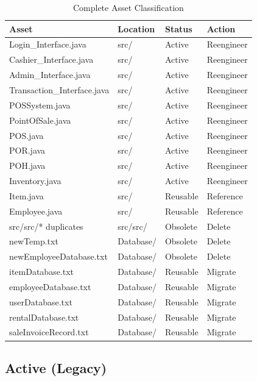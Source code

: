 \begin{table}[h]
  \centering
  \caption{Complete Asset Classification}
  \label{tab:asset-classification}
  \begin{tabular}{p{4cm} p{4.5cm} p{2cm} p{2.5cm}}
    \toprule
    \textbf{Asset} & \textbf{Location} & \textbf{Status} & \textbf{Action} \\
    \midrule
    Login\_Interface.java & src/ & Active & Reengineer \\
    Cashier\_Interface.java & src/ & Active & Reengineer \\
    Admin\_Interface.java & src/ & Active & Reengineer \\
    Transaction\_Interface.java & src/ & Active & Reengineer \\
    POSSystem.java & src/ & Active & Reengineer \\
    PointOfSale.java & src/ & Active & Reengineer \\
    POS.java & src/ & Active & Reengineer \\
    POR.java & src/ & Active & Reengineer \\
    POH.java & src/ & Active & Reengineer \\
    Inventory.java & src/ & Active & Reengineer \\
    Item.java & src/ & Reusable & Reference \\
    Employee.java & src/ & Reusable & Reference \\
    \midrule
    src/src/* duplicates & src/src/ & Obsolete & Delete \\
    newTemp.txt & Database/ & Obsolete & Delete \\
    newEmployeeDatabase.txt & Database/ & Obsolete & Delete \\
    \midrule
    itemDatabase.txt & Database/ & Reusable & Migrate \\
    employeeDatabase.txt & Database/ & Reusable & Migrate \\
    userDatabase.txt & Database/ & Reusable & Migrate \\
    rentalDatabase.txt & Database/ & Reusable & Migrate \\
    saleInvoiceRecord.txt & Database/ & Reusable & Migrate \\
    \bottomrule
  \end{tabular}
\end{table}

\subsection*{Active (Legacy)}

